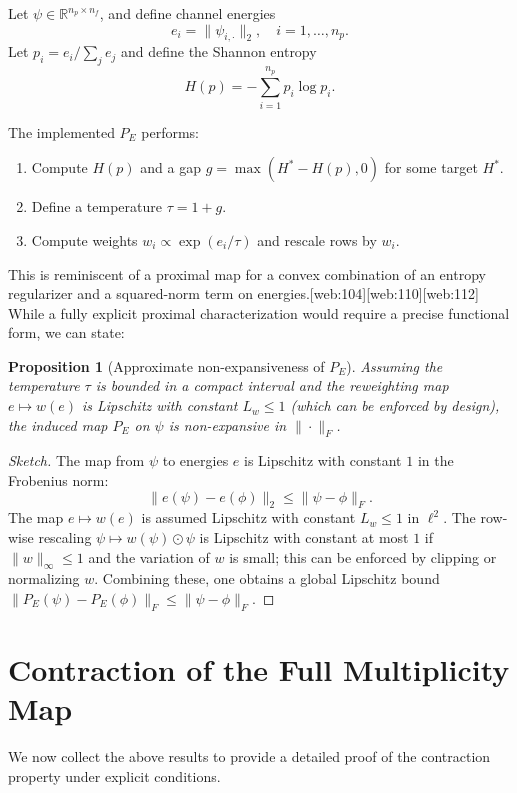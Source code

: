 \documentclass[11pt]{article}
\theoremstyle{definition}
\theoremstyle{plain}
\newtheorem{proposition}{Proposition}
\begin{document}
Let $\psi \in \mathbb{R}^{n_p \times n_f}$, and define channel energies
\[
  e_i = \|\psi_{i,\cdot}\|_2,\quad i=1,\dots,n_p.
\]
Let $p_i = e_i / \sum_j e_j$ and define the Shannon entropy
\[
  H(p) = -\sum_{i=1}^{n_p} p_i \log p_i.
\]

The implemented $P_E$ performs:
\begin{enumerate}
  \item Compute $H(p)$ and a gap $g = \max(H^\ast - H(p),0)$ for some target $H^\ast$.
  \item Define a temperature $\tau = 1 + g$.
  \item Compute weights $w_i \propto \exp(e_i/\tau)$ and rescale rows by $w_i$.
\end{enumerate}

This is reminiscent of a proximal map for a convex combination of an entropy regularizer and a squared-norm term on energies.[web:104][web:110][web:112]
While a fully explicit proximal characterization would require a precise functional form, we can state:

\begin{proposition}[Approximate non-expansiveness of $P_E$]\label{prop:PE_nonexp}
Assuming the temperature $\tau$ is bounded in a compact interval and the reweighting map $e \mapsto w(e)$ is Lipschitz with constant $L_w \le 1$ (which can be enforced by design), the induced map $P_E$ on $\psi$ is non-expansive in $\|\cdot\|_F$.
\end{proposition}

\begin{proof}[Sketch]
The map from $\psi$ to energies $e$ is Lipschitz with constant $1$ in the Frobenius norm:
\[
  \|e(\psi) - e(\phi)\|_2 \le \|\psi - \phi\|_F.
\]
The map $e \mapsto w(e)$ is assumed Lipschitz with constant $L_w \le 1$ in $\ell^2$.
The row-wise rescaling $\psi \mapsto w(\psi)\odot \psi$ is Lipschitz with constant at most $1$ if $\|w\|_\infty \le 1$ and the variation of $w$ is small; this can be enforced by clipping or normalizing $w$.
Combining these, one obtains a global Lipschitz bound $\|P_E(\psi) - P_E(\phi)\|_F \le \|\psi - \phi\|_F$.
\end{proof}

\section{Contraction of the Full Multiplicity Map}

We now collect the above results to provide a detailed proof of the contraction property under explicit conditions.
\end{document}
